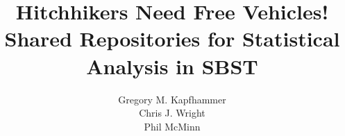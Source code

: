 \documentclass{sig-alternate}
\begin{document}


\title{Hitchhikers Need Free Vehicles! \\ Shared Repositories for Statistical Analysis in SBST \vspace*{-.05in}}


\author{
\alignauthor
Gregory M. Kapfhammer\\
\alignauthor
Chris J. Wright\\
\alignauthor
Phil McMinn\\
}

\maketitle






\vspace*{-.5em}

\scriptsize


\end{document}
